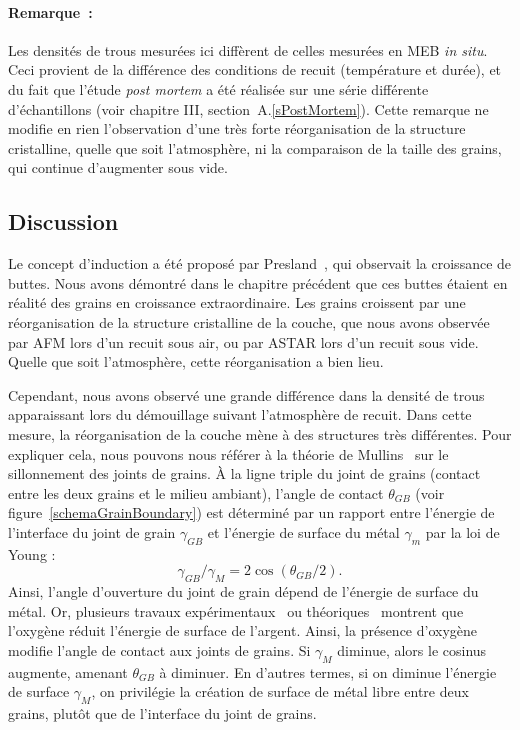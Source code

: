 \paragraph*{Remarque~:} Les densités de trous mesurées ici diffèrent de celles mesurées en MEB \textit{in situ}. Ceci provient de la différence des conditions de recuit (température et durée), et du fait que l'étude \textit{post mortem} a été réalisée sur une série différente d'échantillons (voir chapitre III, section~A.\ref{sPostMortem}). Cette remarque ne modifie en rien l'observation d'une très forte réorganisation de la structure cristalline, quelle que soit l'atmosphère, ni la comparaison de la taille des grains, qui continue d'augmenter sous vide.\par 

		\subsection{Discussion}
Le concept d'induction a été proposé par Presland~\cite{presland1972hillock}, qui observait la croissance de buttes. Nous avons démontré dans le chapitre précédent que ces buttes étaient en réalité des grains en croissance extraordinaire. Les grains croissent par une réorganisation de la structure cristalline de la couche, que nous avons observée par AFM lors d'un recuit sous air, ou par ASTAR lors d'un recuit sous vide. Quelle que soit l'atmosphère, cette réorganisation a bien lieu.\par 
Cependant, nous avons observé une grande différence dans la densité de trous apparaissant lors du démouillage suivant l'atmosphère de recuit. Dans cette mesure, la réorganisation de la couche mène à des structures très différentes. Pour expliquer cela, nous pouvons nous référer à la théorie de Mullins~\cite{mullins1957theory} sur le sillonnement des joints de grains. À la ligne triple du joint de grains (contact entre les deux grains et le milieu ambiant), l'angle de contact $\theta_{GB}$ (voir figure~\ref{schemaGrainBoundary}) est déterminé par un rapport entre l'énergie de l'interface du joint de grain $\gamma_{GB}$ et l'énergie de surface du métal $\gamma_m$ par la loi de Young :
\begin{equation}
\gamma_{GB}/\gamma_M = 2\cos(\theta_{GB}/2).
\end{equation}
Ainsi, l'angle d'ouverture du joint de grain dépend de l'énergie de surface du métal. Or, plusieurs travaux expérimentaux~\cite{buttner1952adsorption} ou théoriques~\cite{molina2011size} montrent que l'oxygène réduit l'énergie de surface de l'argent. Ainsi, la présence d'oxygène modifie l'angle de contact aux joints de grains. Si $\gamma_M$ diminue, alors le cosinus augmente, amenant $\theta_{GB}$ à diminuer. En d'autres termes, si on diminue l'énergie de surface $\gamma_M$, on privilégie la création de surface de métal libre entre deux grains, plutôt que de l'interface du joint de grains.\par 
